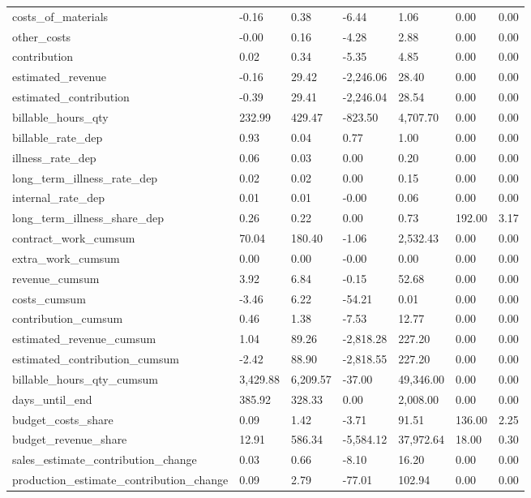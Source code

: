 \begin{landscape}
\begin{longtable}[h!]{lllllll}
costs_of_materials & -0.16 & 0.38 & -6.44 & 1.06 & 0.00 & 0.00 \\
other_costs & -0.00 & 0.16 & -4.28 & 2.88 & 0.00 & 0.00 \\
contribution & 0.02 & 0.34 & -5.35 & 4.85 & 0.00 & 0.00 \\
estimated_revenue & -0.16 & 29.42 & -2,246.06 & 28.40 & 0.00 & 0.00 \\
estimated_contribution & -0.39 & 29.41 & -2,246.04 & 28.54 & 0.00 & 0.00 \\
billable_hours_qty & 232.99 & 429.47 & -823.50 & 4,707.70 & 0.00 & 0.00 \\
billable_rate_dep & 0.93 & 0.04 & 0.77 & 1.00 & 0.00 & 0.00 \\
illness_rate_dep & 0.06 & 0.03 & 0.00 & 0.20 & 0.00 & 0.00 \\
long_term_illness_rate_dep & 0.02 & 0.02 & 0.00 & 0.15 & 0.00 & 0.00 \\
internal_rate_dep & 0.01 & 0.01 & -0.00 & 0.06 & 0.00 & 0.00 \\
long_term_illness_share_dep & 0.26 & 0.22 & 0.00 & 0.73 & 192.00 & 3.17 \\
contract_work_cumsum & 70.04 & 180.40 & -1.06 & 2,532.43 & 0.00 & 0.00 \\
extra_work_cumsum & 0.00 & 0.00 & -0.00 & 0.00 & 0.00 & 0.00 \\
revenue_cumsum & 3.92 & 6.84 & -0.15 & 52.68 & 0.00 & 0.00 \\
costs_cumsum & -3.46 & 6.22 & -54.21 & 0.01 & 0.00 & 0.00 \\
contribution_cumsum & 0.46 & 1.38 & -7.53 & 12.77 & 0.00 & 0.00 \\
estimated_revenue_cumsum & 1.04 & 89.26 & -2,818.28 & 227.20 & 0.00 & 0.00 \\
estimated_contribution_cumsum & -2.42 & 88.90 & -2,818.55 & 227.20 & 0.00 & 0.00 \\
billable_hours_qty_cumsum & 3,429.88 & 6,209.57 & -37.00 & 49,346.00 & 0.00 & 0.00 \\
days_until_end & 385.92 & 328.33 & 0.00 & 2,008.00 & 0.00 & 0.00 \\
budget_costs_share & 0.09 & 1.42 & -3.71 & 91.51 & 136.00 & 2.25 \\
budget_revenue_share & 12.91 & 586.34 & -5,584.12 & 37,972.64 & 18.00 & 0.30 \\
sales_estimate_contribution_change & 0.03 & 0.66 & -8.10 & 16.20 & 0.00 & 0.00 \\
production_estimate_contribution_change & 0.09 & 2.79 & -77.01 & 102.94 & 0.00 & 0.00 \\

\end{longtable}
\end{landscape}
